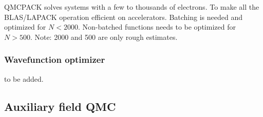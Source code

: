 QMCPACK solves systems with a few to thousands of electrons. To make all the BLAS/LAPACK operation efficient on accelerators.
Batching is needed and optimized for $N < 2000$. Non-batched functions needs to be optimized for $N > 500$.
Note: 2000 and 500 are only rough estimates.

\subsubsection{Wavefunction optimizer}
to be added.

\subsection{Auxiliary field QMC}
